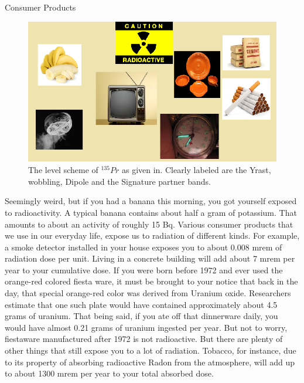 \documentclass[%
 amsmath,amssymb,
]{article}
\begin{document}
\begin{section}{Consumer Products} 
\begin{figure}
\begin{center}
\includegraphics[width = \textwidth]{radiation_household}
\caption{The level scheme of $^{135}Pr$ as given in. Clearly labeled are the Yrast, wobbling, Dipole and the Signature partner bands.}
\end{center}
\end{figure}

Seemingly weird, but if you had a banana this morning, you got yourself exposed to radioactivity. A typical banana contains about half a gram of potassium. That amounts to about an activity of roughly 15 Bq.  Various consumer products that we use in our everyday life, expose us to radiation of different kinds. For example, a smoke detector installed in your house exposes you to about 0.008 mrem of radiation dose per unit. Living in a concrete building will add about 7 mrem per year to your cumulative dose. If you were born before 1972 and ever used the orange-red colored fiesta ware, it must be brought to your notice that back in the day, that special orange-red color was derived from Uranium oxide. Researchers estimate that one such plate would have contained approximately about 4.5 grams of uranium. That being said, if you ate off that dinnerware daily, you would have almost 0.21 grams of uranium ingested per year. But not to worry, fiestaware manufactured after 1972 is not radioactive. But there are plenty of other things that still expose you to a lot of radiation. Tobacco, for instance, due to its property of absorbing radioactive Radon from the atmosphere, will add up to about 1300 mrem per year to your total absorbed dose. 

\end{section}
\end{document}
